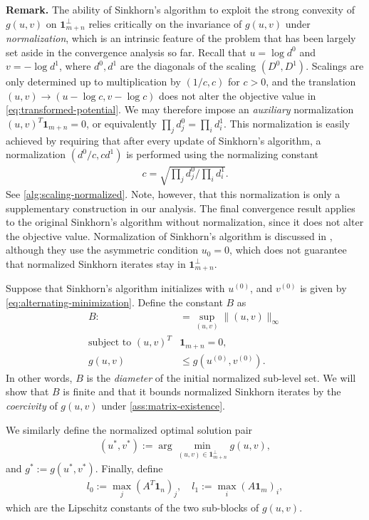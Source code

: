 \textbf{Remark.} The ability of Sinkhorn's algorithm to exploit the strong convexity of $g(u,v)$ on $\mathbf{1}_{m+n}^\perp$ relies critically on the invariance of $g(u,v)$ under \emph{normalization}, which is an intrinsic feature of the problem that has been largely set aside in the convergence analysis so far. Recall that $u=\log d^0$ and $v=-\log d^1$, where $d^0,d^1$ are the diagonals of the scaling $(D^0,D^1)$. Scalings are only determined up to multiplication by $(1/c,c)$ for $c>0$, and the translation $(u,v)\rightarrow(u-\log c,v-\log c)$ does not alter the objective value in \eqref{eq:transformed-potential}. We may therefore impose an \emph{auxiliary} normalization $(u,v)^T\mathbf{1}_{m+n}=0$, or equivalently $\prod_j d^0_j = \prod_i d^1_i$. This normalization is easily achieved by requiring that after every update of Sinkhorn's algorithm, a normalization $(d^0/c,c d^1)$ is performed using the normalizing constant 
\begin{align}
\label{eq:normalization}
   c=\sqrt{\prod_j d^0_j /\prod_i d^1_i}.
\end{align}
See \cref{alg:scaling-normalized}. Note, however, that this normalization is only a supplementary construction in our analysis. The final convergence result applies to the original Sinkhorn's algorithm without normalization, since it does not alter the objective value. Normalization of Sinkhorn's algorithm is discussed in \citet{carlier2023sista}, although they use the asymmetric condition $u_0=0$, which does not guarantee that normalized Sinkhorn iterates stay in $\mathbf{1}_{m+n}^\perp$. 

Suppose that Sinkhorn's algorithm initializes with $u^{(0)}$, and $v^{(0)}$ is given by \eqref{eq:alternating-minimization}. Define the constant $B$ as 
\begin{align*}
   B:&= \sup_{(u,v)} \|(u,v)\|_\infty\\  \text{subject to } (u,v)^{T}&\mathbf{1}_{m+n}=0,\\
   g(u,v)&\leq g(u^{(0)},v^{(0)}).
\end{align*}
In other words, $B$ is the \emph{diameter} of the initial normalized sub-level set. We will show that $B$ is finite and that it bounds normalized Sinkhorn iterates by the \emph{coercivity} of $g(u,v)$ under \cref{ass:matrix-existence}.  

We similarly define the normalized optimal solution pair 
\begin{align}
\label{eq:normalized-optimum}
    (u^\ast,v^\ast):=\arg \min_{(u,v)\in \mathbf{1}_{m+n}^\perp} g(u,v),
\end{align}
and $g^\ast:=g(u^\ast,v^\ast)$.
Finally, define 
\begin{align*}
    l_0:= \max_j (A^T\mathbf{1}_n)_j, \quad l_1:= \max_i (A\mathbf{1}_m)_i,
\end{align*}
which are the Lipschitz constants of the two sub-blocks of $g(u,v)$.

